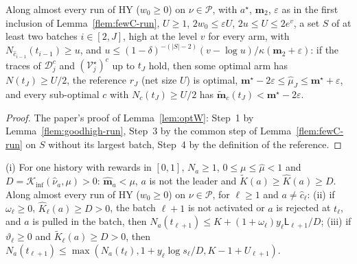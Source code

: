 \documentclass[11pt]{article}
\newcommand{\Kinf}{\mathcal K_{\inf}}
\newcommand{\cP}{\mathcal P}
\begin{document}
\begin{lemma}[an optimal arm in $W$ when $x=1$, on a run]\label{flem:optW-run}
Along almost every run of HY ($w_0\ge0$) on $\nu\in\cP$, with $a^\star$, $\mathbf m_2$, $\varepsilon$ as in the first
inclusion of Lemma~\ref{flem:fewC-run}, $U\ge1$, $2w_0\le\varepsilon U$, $2u\le U\le2e^v$, a set $S$ of at
least two batches $i\in[2,J]$, high at the level $v$ for every arm, with
$N_{\hat c_{i-1}}(t_{i-1})\ge u$, and $u\le(1-\delta)^{-(|S|-2)}(v-\log u)/\kappa(\mathbf m_2+\varepsilon)$: if the traces
of $\mathcal D_j^c$ and $(\mathcal V^\star_j)^c$ up to $t_J$ hold, then some optimal arm has $N(t_J)\ge U/2$, the
reference $r_J$ (net size $U$) is optimal, $\mathbf m^\star-2\varepsilon\le\hat\mu_J\le\mathbf m^\star+\varepsilon$, and every sub-optimal
$c$ with $N_c(t_J)\ge U/2$ has $\tilde{\mathbf m}_c(t_J)<\mathbf m^\star-2\varepsilon$.
\end{lemma}

\begin{proof}
The paper's proof of Lemma~\ref{lem:optW}: Step~1 by Lemma~\ref{flem:goodhigh-run}, Step~3 by the
common step of Lemma~\ref{flem:fewC-run} on $S$ without its largest batch, Step~4 by the
definition of the reference.
\end{proof}

\begin{lemma}[pulls of $a$ when $x=1$, on a run]\label{flem:pullsC-run}
(i) For one history with rewards in $[0,1]$, $N_a\ge1$, $0\le\mu\le\hat\mu<1$ and
$D=\Kinf(\hat\nu_a,\mu)>0$: $\hat{\mathbf m}_a<\mu$, $a$ is not the leader and $\tilde K(a)\ge\hat K(a)\ge D$.
Along almost every run of HY ($w_0\ge0$) on $\nu\in\cP$, for $\ell\ge1$ and $a\ne\hat c_\ell$:
(ii) if $\omega_\ell\ge0$, $\hat K_\ell(a)\ge D>0$, the batch $\ell+1$ is not activated or $a$ is
rejected at $t_\ell$, and $a$ is pulled in the batch, then
$N_a(t_{\ell+1})\le K+(1+\omega_\ell)y_\ell\mathsf L_{\ell+1}/D$;
(iii) if $\vartheta_\ell\ge0$ and $\tilde K_\ell(a)\ge D>0$, then
$N_a(t_{\ell+1})\le\max(N_a(t_\ell),1+y_\ell\log s_\ell/D,K-1+U_{\ell+1})$.
\end{lemma}
\end{document}

